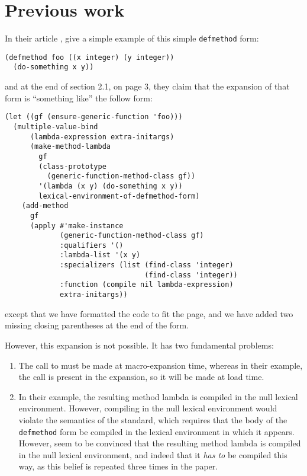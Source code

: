\section{Previous work}

In their article \cite{Constanza:2008}, \cnh{} give a
simple example of this simple \texttt{defmethod} form:

\begin{verbatim}
(defmethod foo ((x integer) (y integer))
  (do-something x y))
\end{verbatim}

\noindent
and at the end of section 2.1, on page 3, they claim that the
expansion of that form is ``something like'' the follow form:

{\small\begin{verbatim}
(let ((gf (ensure-generic-function 'foo)))
  (multiple-value-bind
      (lambda-expression extra-initargs)
      (make-method-lambda
        gf
        (class-prototype
          (generic-function-method-class gf))
        '(lambda (x y) (do-something x y))
        lexical-environment-of-defmethod-form)
    (add-method
      gf
      (apply #'make-instance
             (generic-function-method-class gf)
             :qualifiers '()
             :lambda-list '(x y)
             :specializers (list (find-class 'integer)
                                 (find-class 'integer))
             :function (compile nil lambda-expression)
             extra-initargs))
\end{verbatim}}

\noindent
except that we have formatted the code to fit the page, and we have
added two missing closing parentheses at the end of the form.

However, this expansion is not possible.  It has two fundamental
problems:

\begin{enumerate}
\item The call to \mml{} must be made at macro-expansion time, whereas
  in their example, the call is present in the expansion, so it will
  be made at load time.
\item In their example, the resulting method lambda is compiled in the
  null lexical environment.  However, compiling in the null lexical
  environment would violate the semantics of the \commonlisp{}
  standard, which requires that the body of the \texttt{defmethod}
  form be compiled in the lexical environment in which it appears.
  However, \cnh{} seem to be convinced that the resulting method
  lambda is compiled in the null lexical environment, and indeed that
  it \emph{has to} be compiled this way, as this belief is repeated
  three times in the paper.
\end{enumerate}

